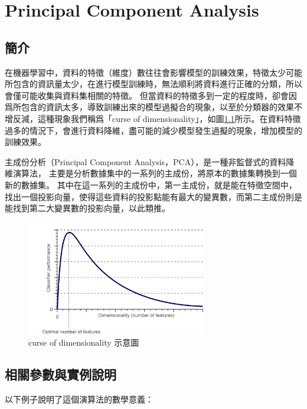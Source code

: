 \chapter{Principal Component Analysis}
\label{chapter:pca}
\section{簡介}
\label{sec:introduction}


在機器學習中，資料的特徵（維度）數往往會影響模型的訓練效果，特徵太少可能所包含的資訊量太少，在進行模型訓練時，無法順利將資料進行正確的分類，所以會僅可能收集與資料集相關的特徵。
但當資料的特徵多到一定的程度時，卻會因爲所包含的資訊太多，導致訓練出來的模型過擬合的現象，以至於分類器的效果不增反減，這種現象我們稱爲「curse of dimensionality」，如圖\ref{fig:CurseOfDimesionality}所示。在資料特徵過多的情況下，會進行資料降維，盡可能的減少模型發生過擬的現象，增加模型的訓練效果。

主成份分析（Principal Component Analysis，PCA），是一種非監督式的資料降維演算法，
主要是分析數據集中的一系列的主成份，將原本的數據集轉換到一個新的數據集。
其中在這一系列的主成份中，第一主成份，就是能在特徵空間中，找出一個投影向量，使得這些資料的投影點能有最大的變異數，而第二主成份則是能找到第二大變異數的投影向量，以此類推。




\begin{figure}[h]
	\centering
	\includegraphics[height=5cm]{./pic/NZgacRXF.png}
	\caption{curse of dimensionality 示意圖}
	\label{fig:CurseOfDimesionality}
\end{figure}

\section{相關參數與實例說明}
以下例子說明了這個演算法的數學意義：

